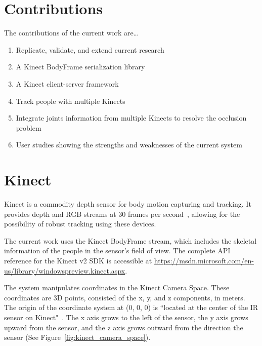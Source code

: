 \section{Contributions}
\label{sec:introduction_contributions}

The contributions of the current work are\ldots

\begin{enumerate}
  \item Replicate, validate, and extend current research
  \item A Kinect BodyFrame serialization library
  \item A Kinect client-server framework
  \item Track people with multiple Kinects
  \item Integrate joints information from multiple Kinects to resolve the occlusion problem
  \item User studies showing the strengths and weaknesses of the current system
\end{enumerate}

\section{Kinect}
\label{sec:introduction_kinect}

Kinect is a commodity depth sensor for body motion capturing and tracking. It provides depth and RGB streams at 30 frames per second~\cite{kinect_sensor_specs}, allowing for the possibility of robust tracking using these devices.

The current work uses the Kinect BodyFrame stream, which includes the skeletal information of the people in the sensor's field of view. The complete API reference for the Kinect v2 SDK is accessible at \url{https://msdn.microsoft.com/en-us/library/windowspreview.kinect.aspx}.

The system manipulates coordinates in the Kinect Camera Space. These coordinates are 3D points, consisted of the x, y, and z components, in meters. The origin of the coordinate system at (0, 0, 0) is ``located at the center of the IR sensor on Kinect"~\cite{microsoft_kinect_coordinates}. The x axis grows to the left of the sensor, the y axis grows upward from the sensor, and the z axis grows outward from the direction the sensor (See Figure~\ref{fig:kinect_camera_space}).

